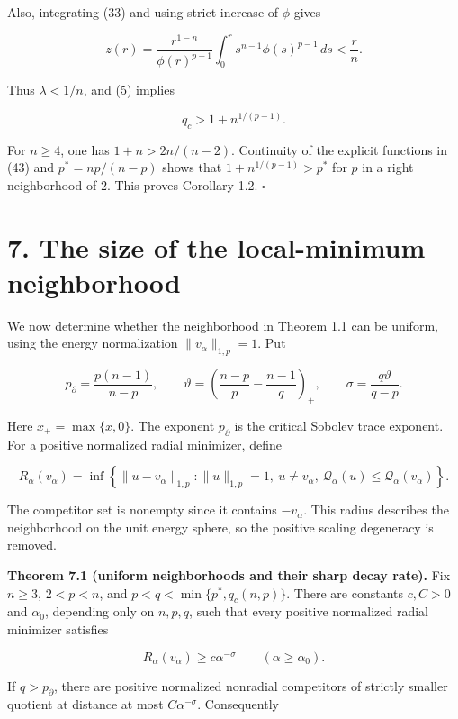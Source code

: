 \documentclass[11pt]{article}
\begin{document}
Also, integrating (33) and using strict increase of \(\phi\) gives

\[
z(r)=\frac{r^{1-n}}{\phi(r)^{p-1}}
 \int_0^r s^{n-1}\phi(s)^{p-1}\,ds<\frac rn.
\]

Thus \(\lambda<1/n\), and (5) implies

\[
q_c>1+n^{1/(p-1)}.
\tag{43}
\]

For \(n\ge4\), one has \(1+n>2n/(n-2)\). Continuity of the explicit
functions in (43) and \(p^*=np/(n-p)\) shows that \(1+n^{1/(p-1)}>p^*\)
for \(p\) in a right neighborhood of \(2\). This proves Corollary 1.2.
\(\square\)

\section{7. The size of the local-minimum
neighborhood}\label{the-size-of-the-local-minimum-neighborhood}

We now determine whether the neighborhood in Theorem 1.1 can be uniform,
using the energy normalization \(\|v_\alpha\|_{1,p}=1\). Put

\[
p_\partial=\frac{p(n-1)}{n-p},\qquad
\vartheta=\left(\frac{n-p}{p}-\frac{n-1}{q}\right)_+,
\qquad \sigma=\frac{q\vartheta}{q-p}.
\tag{7.1}
\]

Here \(x_+=\max\{x,0\}\). The exponent \(p_\partial\) is the critical
Sobolev trace exponent. For a positive normalized radial minimizer,
define

\[
R_\alpha(v_\alpha)=\inf\left\{\|u-v_\alpha\|_{1,p}:
\|u\|_{1,p}=1,\ u\ne v_\alpha,
\ \mathcal Q_\alpha(u)\le\mathcal Q_\alpha(v_\alpha)\right\}.
\tag{7.2}
\]

The competitor set is nonempty since it contains \(-v_\alpha\). This
radius describes the neighborhood on the unit energy sphere, so the
positive scaling degeneracy is removed.

\textbf{Theorem 7.1 (uniform neighborhoods and their sharp decay rate).}
Fix \(n\ge3\), \(2<p<n\), and \(p<q<\min\{p^*,q_c(n,p)\}\). There are
constants \(c,C>0\) and \(\alpha_0\), depending only on \(n,p,q\), such
that every positive normalized radial minimizer satisfies

\[
R_\alpha(v_\alpha)\ge c\alpha^{-\sigma}
\qquad(\alpha\ge\alpha_0).
\tag{7.3}
\]

If \(q>p_\partial\), there are positive normalized nonradial competitors
of strictly smaller quotient at distance at most \(C\alpha^{-\sigma}\).
Consequently
\end{document}
